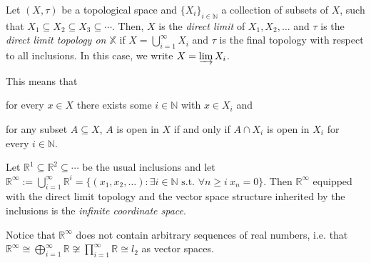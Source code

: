 \begin{definition} Let $(X,\tau)$ be a topological space and $\{X_i\}_{i\in\mathbb{N}}$ a collection of subsets of $X$, such that $X_1\subseteq X_2\subseteq X_3\subseteq\cdots$. Then, $X$ is the \emph{direct limit} of $X_1,X_2,\ldots$ and $\tau$ is the \emph{direct limit topology on $\mathbb{X}$} if $X=\bigcup_{i=1}^{\infty}X_i$ and $\tau$ is the final topology with respect to all inclusions. In this case, we write $X=\varinjlim X_i$.
\end{definition}
\begin{remark} This means that
\begin{b_item}
\item for every $x\in X$ there exists some $i\in\mathbb{N}$ with $x\in X_i$ and
\item for any subset $A\subseteq X$, $A$ is open in $X$ if and only if $A\cap X_i$ is open in $X_i$ for every $i\in\mathbb{N}$.
\end{b_item}
\end{remark}

\begin{definition} Let $\mathbb{R}^1\subseteq\mathbb{R}^2\subseteq\cdots$ be the usual inclusions and let $\mathbb{R}^{\infty}:=\bigcup_{i=1}^{\infty}\mathbb{R}^i=\big\{(x_1,x_2,\ldots):\exists i\in\mathbb{N}\text{ s.t. }\forall n\geq i\ x_n=0\big\}$. Then $\mathbb{R}^{\infty}$ equipped with the direct limit topology and the vector space structure inherited by the inclusions is the \emph{infinite coordinate space}.
\end{definition}
\begin{remark} Notice that $\mathbb{R}^{\infty}$ does not contain arbitrary sequences of real numbers, i.e. that $\mathbb{R}^{\infty}\cong\bigoplus_{i=1}^{\infty}\mathbb{R}\not\cong\prod_{i=1}^{\infty}\mathbb{R}\cong l_2$ as vector spaces.
\end{remark}

